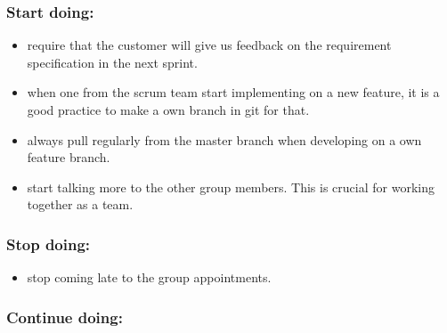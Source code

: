 	\subsubsection*{Start doing: } 
		\begin{itemize}
			\item require that the customer will give us feedback on the
			requirement specification in the next sprint.
			\item when one from the scrum team start implementing on a new feature, 
			it is a good practice to make a own branch in git for that. 
			\item always pull regularly from the master branch when developing
			on a own feature branch.
			\item start talking more to the other group members. This is crucial 
			for working together as a team.
		\end{itemize}
	\subsubsection*{Stop doing: } 
		\begin{itemize}
			\item stop coming late to the group appointments.
		\end{itemize}
	\subsubsection*{Continue doing: } 
